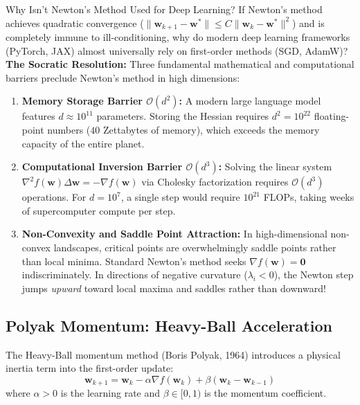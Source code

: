 \begin{ponderbox}{Why Isn't Newton's Method Used for Deep Learning?}
If Newton's method achieves quadratic convergence ($\| \mathbf{w}_{k+1} - \mathbf{w}^* \| \le C \| \mathbf{w}_k - \mathbf{w}^* \|^2$) and is completely immune to ill-conditioning, why do modern deep learning frameworks (PyTorch, JAX) almost universally rely on first-order methods (SGD, AdamW)?
\tcblower
\textbf{The Socratic Resolution:} Three fundamental mathematical and computational barriers preclude Newton's method in high dimensions:
\begin{enumerate}
    \item \textbf{Memory Storage Barrier $\mathcal{O}(d^2)$:} A modern large language model features $d \approx 10^{11}$ parameters. Storing the Hessian requires $d^2 = 10^{22}$ floating-point numbers ($40$ Zettabytes of memory), which exceeds the memory capacity of the entire planet.
    \item \textbf{Computational Inversion Barrier $\mathcal{O}(d^3)$:} Solving the linear system $\nabla^2 f(\mathbf{w})\Delta \mathbf{w} = -\nabla f(\mathbf{w})$ via Cholesky factorization requires $\mathcal{O}(d^3)$ operations. For $d = 10^7$, a single step would require $10^{21}$ FLOPs, taking weeks of supercomputer compute per step.
    \item \textbf{Non-Convexity and Saddle Point Attraction:} In high-dimensional non-convex landscapes, critical points are overwhelmingly saddle points rather than local minima. Standard Newton's method seeks $\nabla f(\mathbf{w}) = \mathbf{0}$ indiscriminately. In directions of negative curvature ($\lambda_i < 0$), the Newton step jumps \emph{upward} toward local maxima and saddles rather than downward!
\end{enumerate}
\end{ponderbox}

\subsection{Polyak Momentum: Heavy-Ball Acceleration}
The Heavy-Ball momentum method (Boris Polyak, 1964) introduces a physical inertia term into the first-order update:
\begin{equation}
\mathbf{w}_{k+1} = \mathbf{w}_k - \alpha \nabla f(\mathbf{w}_k) + \beta (\mathbf{w}_k - \mathbf{w}_{k-1})
\label{eq:momentum_update}
\end{equation}
where $\alpha > 0$ is the learning rate and $\beta \in [0, 1)$ is the momentum coefficient.

